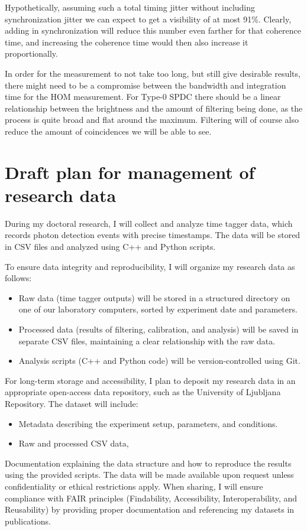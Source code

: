 \documentclass{article}
\begin{document}
Hypothetically, assuming such a total timing jitter without including synchronization jitter we can expect to get a visibility of at most 91\%. Clearly,
adding in synchronization will reduce this number even farther for that coherence time, and increasing the coherence time would then also increase it proportionally.
\par In order for the measurement to not take too long, but still give desirable results, there might need to be a compromise
between the bandwidth and integration time for the HOM measurement. For Type-0 SPDC there should be a linear relationship between the brightness
and the amount of filtering being done, as the process is quite broad and flat around the maximum.
Filtering will of course also reduce the amount of coincidences we will be able to see.


\section{Draft plan for management of research data}
During my doctoral research, I will collect and analyze time tagger data,
which records photon detection events with precise timestamps.
The data will be stored in CSV files and analyzed using C++ and Python scripts.

To ensure data integrity and reproducibility, I will organize my research data as follows:
\begin{itemize}
	\item Raw data (time tagger outputs) will be stored in a structured directory on one of our laboratory computers, sorted by experiment date and parameters.
	\item Processed data (results of filtering, calibration, and analysis) will be saved in separate CSV files, maintaining a clear relationship with the raw data.
	\item Analysis scripts (C++ and Python code) will be version-controlled using Git.
\end{itemize}
For long-term storage and accessibility, I plan to deposit my research data in an appropriate open-access data repository,
such as the University of Ljubljana Repository. The dataset will include:

\begin{itemize}
	\item Metadata describing the experiment setup, parameters, and conditions.
	\item Raw and processed CSV data,
\end{itemize}

Documentation explaining the data structure and how to reproduce the results using the provided scripts.
The data will be made available upon request unless confidentiality or ethical restrictions apply.
When sharing, I will ensure compliance with FAIR principles (Findability, Accessibility,
Interoperability, and Reusability) by providing proper documentation and referencing my datasets in publications.
\newpage


\end{document}
